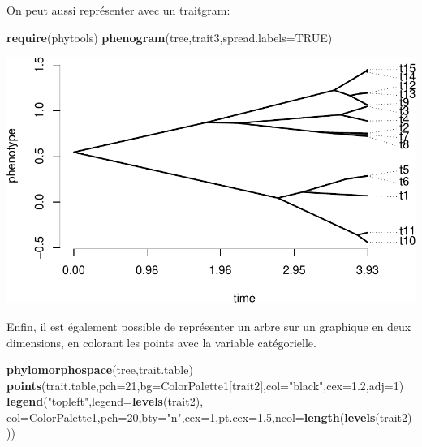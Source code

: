 \documentclass[
]{book}
\newenvironment{Shaded}{\begin{snugshade}}{\end{snugshade}}
\newcommand{\AttributeTok}[1]{\textcolor[rgb]{0.13,0.29,0.53}{#1}}
\newcommand{\ConstantTok}[1]{\textcolor[rgb]{0.56,0.35,0.01}{#1}}
\newcommand{\DecValTok}[1]{\textcolor[rgb]{0.00,0.00,0.81}{#1}}
\newcommand{\FloatTok}[1]{\textcolor[rgb]{0.00,0.00,0.81}{#1}}
\newcommand{\FunctionTok}[1]{\textcolor[rgb]{0.13,0.29,0.53}{\textbf{#1}}}
\newcommand{\NormalTok}[1]{#1}
\newcommand{\StringTok}[1]{\textcolor[rgb]{0.31,0.60,0.02}{#1}}
\begin{document}
On peut aussi représenter avec un traitgram:

\begin{Shaded}
\begin{Highlighting}[]
\FunctionTok{require}\NormalTok{(phytools)}
\FunctionTok{phenogram}\NormalTok{(tree,trait3,}\AttributeTok{spread.labels=}\ConstantTok{TRUE}\NormalTok{)}
\end{Highlighting}
\end{Shaded}

\includegraphics{pcm-workshop_files/figure-latex/traitgram-1.pdf}

Enfin, il est également possible de représenter un arbre sur un graphique en deux dimensions, en colorant les points avec la variable catégorielle.

\begin{Shaded}
\begin{Highlighting}[]
\FunctionTok{phylomorphospace}\NormalTok{(tree,trait.table)}
\FunctionTok{points}\NormalTok{(trait.table,}\AttributeTok{pch=}\DecValTok{21}\NormalTok{,}\AttributeTok{bg=}\NormalTok{ColorPalette1[trait2],}\AttributeTok{col=}\StringTok{"black"}\NormalTok{,}\AttributeTok{cex=}\FloatTok{1.2}\NormalTok{,}\AttributeTok{adj=}\DecValTok{1}\NormalTok{)}
\FunctionTok{legend}\NormalTok{(}\StringTok{"topleft"}\NormalTok{,}\AttributeTok{legend=}\FunctionTok{levels}\NormalTok{(trait2),}
       \AttributeTok{col=}\NormalTok{ColorPalette1,}\AttributeTok{pch=}\DecValTok{20}\NormalTok{,}\AttributeTok{bty=}\StringTok{"n"}\NormalTok{,}\AttributeTok{cex=}\DecValTok{1}\NormalTok{,}\AttributeTok{pt.cex=}\FloatTok{1.5}\NormalTok{,}\AttributeTok{ncol=}\FunctionTok{length}\NormalTok{(}\FunctionTok{levels}\NormalTok{(trait2)))}
\end{Highlighting}
\end{Shaded}
\end{document}
